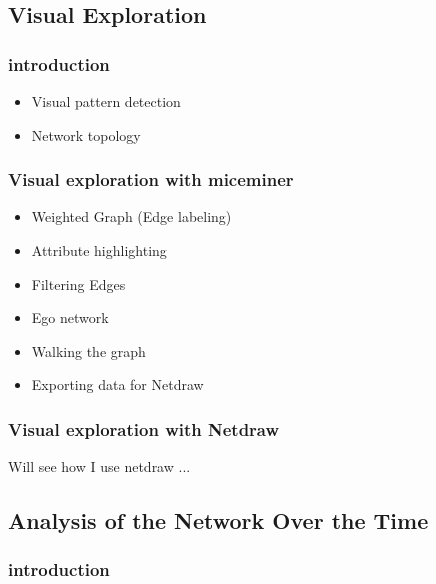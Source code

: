 \newpage
\subsection{Visual Exploration}
\label{subsec:visexp}

\subsubsection{introduction}
\label{subsubsec:visexpintro}

\begin{itemize} 
	\item Visual pattern detection
	\item Network topology
\end{itemize}

\subsubsection{Visual exploration with miceminer}
\label{subsec:visexpmiceminer}

\begin{itemize} 
	\item Weighted Graph (Edge labeling)
	\item Attribute highlighting
	\item Filtering Edges	
	\item Ego network	
	\item Walking the graph		
	\item Exporting data for Netdraw			
\end{itemize}

\subsubsection{Visual exploration with Netdraw}
\label{subsubsec:visexpnetdraw}

Will see how I use netdraw ...

\newpage
\subsection{Analysis of the Network Over the Time}
\label{subsec:netan}

\subsubsection{introduction}
\label{subsubsec:netanintro}

